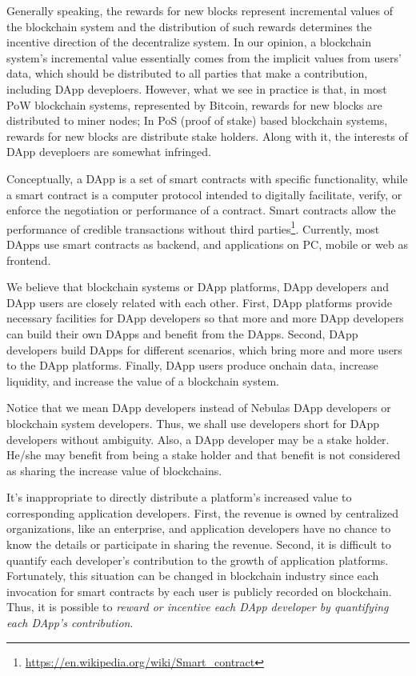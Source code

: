 Generally speaking, the rewards for new blocks represent incremental values of the blockchain system and the distribution of such rewards determines the incentive direction of the decentralize system. In our opinion, a blockchain system's incremental value essentially comes from the implicit values from users' data, which should be distributed to all parties that make a contribution, including DApp deveploers. However, what we see in practice is that, in most PoW blockchain systems, represented by Bitcoin, rewards for new blocks are distributed to miner nodes; In PoS (proof of stake) based blockchain systems, rewards for new blocks are distribute stake holders. Along with it, the interests of DApp deveploers are somewhat infringed.

Conceptually, a DApp is a set of smart contracts with specific
functionality, while a smart contract is a computer protocol intended to
digitally facilitate, verify, or enforce the negotiation or performance of a
contract. Smart contracts allow the performance of credible transactions
without third
parties\footnote{\url{https://en.wikipedia.org/wiki/Smart\_contract}}.
Currently, most DApps use smart contracts as backend, and applications on PC,
mobile or web as frontend.

We believe that blockchain systems or DApp platforms, DApp developers and DApp
users are closely related with each other. First, DApp platforms provide
necessary facilities for DApp developers so that more and more DApp developers
can build their own DApps and benefit from the DApps. Second, DApp
developers build DApps for different scenarios, which bring more and more
users to the DApp platforms. Finally, DApp users produce onchain data,
increase liquidity, and increase the value of a blockchain system.

Notice that we mean DApp developers instead of Nebulas DApp developers or
blockchain system developers. Thus, we shall use developers short for DApp
developers without ambiguity. Also, a DApp developer may be a stake holder.
He/she may benefit from being a stake holder and that benefit is not considered
as sharing the increase value of blockchains.


It's inappropriate to directly distribute a platform's increased value to
corresponding application developers. First, the revenue is owned by
centralized organizations, like an enterprise, and application developers have
no chance to know the details or participate in sharing the revenue. Second, it
is difficult to quantify each developer's contribution to the growth of
application platforms. Fortunately, this situation can be changed in blockchain
industry since each invocation for smart contracts by each user is
publicly recorded on
blockchain. Thus, it is possible to \emph{reward or incentive each DApp developer by
quantifying each DApp's contribution}.

